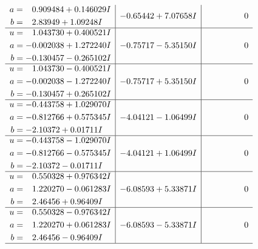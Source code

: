 \documentclass[1p]{elsarticle_modified}
\theoremstyle{definition}
\begin{document}
$$\begin{array}{c|c|c}
\begin{aligned}
a &= \phantom{-}0.909484 + 0.146029 I \\
b &= \phantom{-}2.83949 + 1.09248 I\end{aligned}
 & -0.65442 + 7.07658 I & \phantom{-0.000000 } 0 \\ \hline\begin{aligned}
u &= \phantom{-}1.043730 + 0.400521 I \\
a &= -0.002038 + 1.272240 I \\
b &= -0.130457 - 0.265102 I\end{aligned}
 & -0.75717 - 5.35150 I & \phantom{-0.000000 } 0 \\ \hline\begin{aligned}
u &= \phantom{-}1.043730 - 0.400521 I \\
a &= -0.002038 - 1.272240 I \\
b &= -0.130457 + 0.265102 I\end{aligned}
 & -0.75717 + 5.35150 I & \phantom{-0.000000 } 0 \\ \hline\begin{aligned}
u &= -0.443758 + 1.029070 I \\
a &= -0.812766 + 0.575345 I \\
b &= -2.10372 + 0.01711 I\end{aligned}
 & -4.04121 - 1.06499 I & \phantom{-0.000000 } 0 \\ \hline\begin{aligned}
u &= -0.443758 - 1.029070 I \\
a &= -0.812766 - 0.575345 I \\
b &= -2.10372 - 0.01711 I\end{aligned}
 & -4.04121 + 1.06499 I & \phantom{-0.000000 } 0 \\ \hline\begin{aligned}
u &= \phantom{-}0.550328 + 0.976342 I \\
a &= \phantom{-}1.220270 - 0.061283 I \\
b &= \phantom{-}2.46456 + 0.96409 I\end{aligned}
 & -6.08593 + 5.33871 I & \phantom{-0.000000 } 0 \\ \hline\begin{aligned}
u &= \phantom{-}0.550328 - 0.976342 I \\
a &= \phantom{-}1.220270 + 0.061283 I \\
b &= \phantom{-}2.46456 - 0.96409 I\end{aligned}
 & -6.08593 - 5.33871 I & \phantom{-0.000000 } 0\\
 \hline 

\end{array}$$
\end{document}
